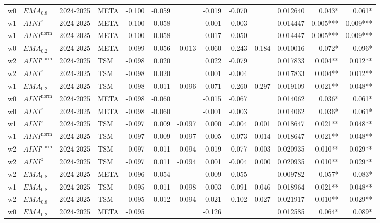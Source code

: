 \begin{longtable}{@{}llllrrrrrrrrr@{}}
w0 & $EMA_{0.8}$ & 2024-2025 & META & -0.100 & -0.059 &  & -0.019 & -0.070 &  & 0.012640 & 0.043* & 0.061* \\
w1 & $AINI^{z}$ & 2024-2025 & META & -0.100 & -0.058 &  & -0.001 & -0.003 &  & 0.014447 & 0.005*** & 0.009*** \\
w1 & $AINI^{\mathrm{norm}}$ & 2024-2025 & META & -0.100 & -0.058 &  & -0.017 & -0.050 &  & 0.014447 & 0.005*** & 0.009*** \\
w0 & $EMA_{0.2}$ & 2024-2025 & META & -0.099 & -0.056 & 0.013 & -0.060 & -0.243 & 0.184 & 0.010016 & 0.072* & 0.096* \\
w2 & $AINI^{\mathrm{norm}}$ & 2024-2025 & TSM & -0.098 & 0.020 &  & 0.022 & -0.079 &  & 0.017833 & 0.004** & 0.012** \\
w2 & $AINI^{z}$ & 2024-2025 & TSM & -0.098 & 0.020 &  & 0.001 & -0.004 &  & 0.017833 & 0.004** & 0.012** \\
w1 & $EMA_{0.2}$ & 2024-2025 & TSM & -0.098 & 0.011 & -0.096 & -0.071 & -0.260 & 0.297 & 0.019109 & 0.021** & 0.048** \\
w0 & $AINI^{\mathrm{norm}}$ & 2024-2025 & META & -0.098 & -0.060 &  & -0.015 & -0.067 &  & 0.014062 & 0.036* & 0.061* \\
w0 & $AINI^{z}$ & 2024-2025 & META & -0.098 & -0.060 &  & -0.001 & -0.003 &  & 0.014062 & 0.036* & 0.061* \\
w1 & $AINI^{z}$ & 2024-2025 & TSM & -0.097 & 0.009 & -0.097 & 0.000 & -0.004 & 0.001 & 0.018647 & 0.021** & 0.048** \\
w1 & $AINI^{\mathrm{norm}}$ & 2024-2025 & TSM & -0.097 & 0.009 & -0.097 & 0.005 & -0.073 & 0.014 & 0.018647 & 0.021** & 0.048** \\
w2 & $AINI^{\mathrm{norm}}$ & 2024-2025 & TSM & -0.097 & 0.011 & -0.094 & 0.019 & -0.077 & 0.003 & 0.020935 & 0.010** & 0.029** \\
w2 & $AINI^{z}$ & 2024-2025 & TSM & -0.097 & 0.011 & -0.094 & 0.001 & -0.004 & 0.000 & 0.020935 & 0.010** & 0.029** \\
w2 & $EMA_{0.8}$ & 2024-2025 & META & -0.096 & -0.054 &  & -0.009 & -0.055 &  & 0.009782 & 0.057* & 0.083* \\
w1 & $EMA_{0.8}$ & 2024-2025 & TSM & -0.095 & 0.011 & -0.098 & -0.003 & -0.091 & 0.046 & 0.018964 & 0.021** & 0.048** \\
w2 & $EMA_{0.8}$ & 2024-2025 & TSM & -0.095 & 0.012 & -0.094 & 0.021 & -0.102 & 0.027 & 0.021917 & 0.010** & 0.029** \\
w0 & $EMA_{0.2}$ & 2024-2025 & META & -0.095 &  &  & -0.126 &  &  & 0.012585 & 0.064* & 0.089* \\

\end{longtable}
